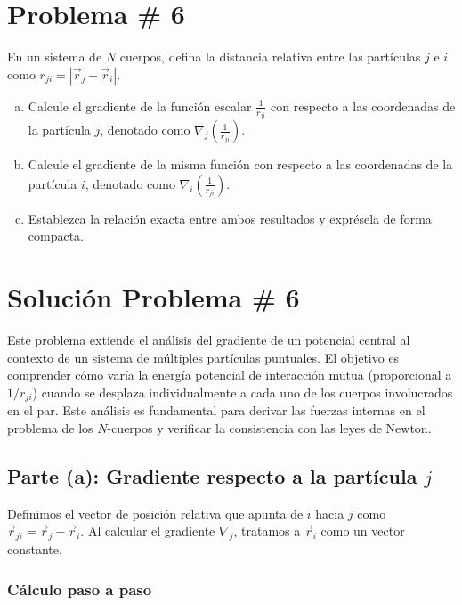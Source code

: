 \documentclass[a4paper]{article}
\begin{document}
\section{Problema \# 6}

En un sistema de $N$ cuerpos, defina la distancia relativa entre las partículas $j$ e $i$ como $r_{ji} = |\vec{r}_j - \vec{r}_i|$.

\begin{enumerate}[a)]
    \item Calcule el gradiente de la función escalar $\frac{1}{r_{ji}}$ con respecto a las coordenadas de la partícula $j$, denotado como $\nabla_j \left( \frac{1}{r_{ji}} \right)$.
    \item Calcule el gradiente de la misma función con respecto a las coordenadas de la partícula $i$, denotado como $\nabla_i \left( \frac{1}{r_{ji}} \right)$.
    \item Establezca la relación exacta entre ambos resultados y exprésela de forma compacta.
\end{enumerate}

\section*{Solución Problema \# 6}

Este problema extiende el análisis del gradiente de un potencial central al contexto de un sistema de múltiples partículas puntuales. El objetivo es comprender cómo varía la energía potencial de interacción mutua (proporcional a $1/r_{ji}$) cuando se desplaza individualmente a cada uno de los cuerpos involucrados en el par. Este análisis es fundamental para derivar las fuerzas internas en el problema de los $N$-cuerpos y verificar la consistencia con las leyes de Newton.

\subsection{Parte (a): Gradiente respecto a la partícula $j$}

Definimos el vector de posición relativa que apunta de $i$ hacia $j$ como $\vec{r}_{ji} = \vec{r}_j - \vec{r}_i$. Al calcular el gradiente $\nabla_j$, tratamos a $\vec{r}_i$ como un vector constante.

\subsubsection{Cálculo paso a paso}
\end{document}
